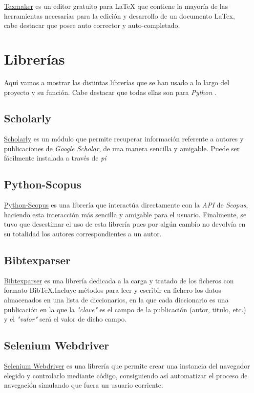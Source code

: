 \href {https://es.wikipedia.org/wiki/Texmaker}{Texmaker} es un editor gratuito para LaTeX\label{latex} que contiene la mayoría de las herramientas necesarias para la edición y desarrollo de un documento LaTex, cabe destacar que posee auto corrector y auto-completado.

\section{Librerías}

Aquí vamos a mostrar las distintas librerías que se han usado a lo largo del proyecto y su función. Cabe destacar que todas ellas son para \emph{Python} .
\subsection{Scholarly}

\href{https://github.com/OrganicIrradiation/scholarly}{Scholarly} es un módulo que permite recuperar información referente a autores y publicaciones de \emph{Google Scholar}, de una manera sencilla y amigable. Puede ser fácilmente instalada a través de \emph{pi}
\subsection{Python-Scopus}

\href {https://github.com/zhiyzuo/python-scopus}{Python-Scopus} es una librería que interactúa directamente con la \emph{API} de \emph {Scopus}, haciendo esta interacción más sencilla y amigable para el usuario.
	Finalmente, se tuvo que desestimar el uso de esta librería pues por algún cambio no devolvía en su totalidad los autores correspondientes a un autor.

\subsection{Bibtexparser}

\href{https://bibtexparser.readthedocs.io/en/master/} {Bibtexparser} es una librería dedicada a la carga y tratado de los ficheros con formato BibTeX.Incluye métodos para leer y escribir en fichero los datos almacenados en una lista de diccionarios, en la que cada diccionario es una publicación en la que la \emph{"clave"} es el campo de la publicación (autor, titulo, etc.) y el \emph{"valor"} será el valor de dicho campo.
\subsection{Selenium Webdriver}
\href {https://www.seleniumhq.org/projects/webdriver/}{Selenium Webdriver} es una librería que permite crear una instancia del navegador elegido y controlarlo mediante código, consiguiendo así automatizar el proceso de navegación simulando que fuera un usuario corriente.
